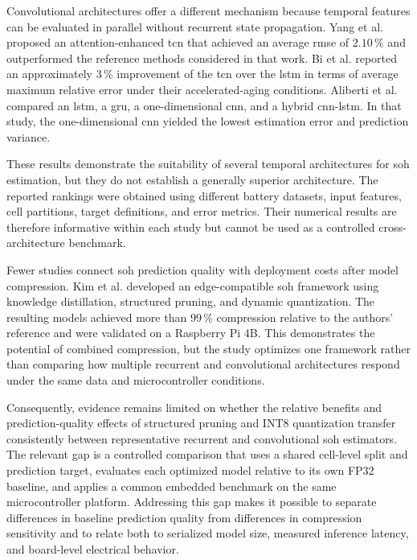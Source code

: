 \documentclass[final,3p,times]{elsarticle}
\begin{document}
Convolutional architectures offer a different mechanism because temporal features can be evaluated in parallel without recurrent state propagation. Yang et al. \cite{yang_state_2024} proposed an attention-enhanced \ac{tcn} that achieved an average \ac{rmse} of $2.10\,\%$ and outperformed the reference methods considered in that work. Bi et al. \cite{bi_performance_2022} reported an approximately $3\,\%$ improvement of the \ac{tcn} over the \ac{lstm} in terms of average maximum relative error under their accelerated-aging conditions. Aliberti et al. \cite{aliberti_comparative_2022} compared an \ac{lstm}, a \ac{gru}, a one-dimensional \ac{cnn}, and a hybrid \ac{cnn}-\ac{lstm}. In that study, the one-dimensional \ac{cnn} yielded the lowest estimation error and prediction variance.

These results demonstrate the suitability of several temporal architectures for \ac{soh} estimation, but they do not establish a generally superior architecture. The reported rankings were obtained using different battery datasets, input features, cell partitions, target definitions, and error metrics. Their numerical results are therefore informative within each study but cannot be used as a controlled cross-architecture benchmark.

Fewer studies connect \ac{soh} prediction quality with deployment costs after model compression. Kim et al. \cite{kim_edge-compatible_2025} developed an edge-compatible \ac{soh} framework using knowledge distillation, structured pruning, and dynamic quantization. The resulting models achieved more than $99\,\%$ compression relative to the authors' reference and were validated on a Raspberry Pi 4B. This demonstrates the potential of combined compression, but the study optimizes one framework rather than comparing how multiple recurrent and convolutional architectures respond under the same data and microcontroller conditions.

Consequently, evidence remains limited on whether the relative benefits and prediction-quality effects of structured pruning and INT8 quantization transfer consistently between representative recurrent and convolutional \ac{soh} estimators. The relevant gap is a controlled comparison that uses a shared cell-level split and prediction target, evaluates each optimized model relative to its own FP32 baseline, and applies a common embedded benchmark on the same microcontroller platform. Addressing this gap makes it possible to separate differences in baseline prediction quality from differences in compression sensitivity and to relate both to serialized model size, measured inference latency, and board-level electrical behavior.
\end{document}
